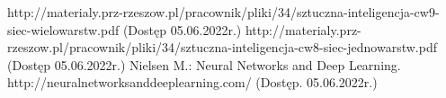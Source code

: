 \documentclass[12pt,twoside]{article}
\begin{document}
\clearpage


\begin{thebibliography}{4}
	 http://materialy.prz-rzeszow.pl/pracownik/pliki/34/sztuczna-inteligencja-cw9-siec-wielowarstw.pdf (Dostęp 05.06.2022r.)
	 http://materialy.prz-rzeszow.pl/pracownik/pliki/34/sztuczna-inteligencja-cw8-siec-jednowarstw.pdf (Dostęp 05.06.2022r.)
	 Nielsen M.: Neural Networks and Deep Learning. http://neuralnetworksanddeeplearning.com/ (Dostęp. 05.06.2022r.)
\end{thebibliography}

\clearpage

\makesummary
\end{document}
